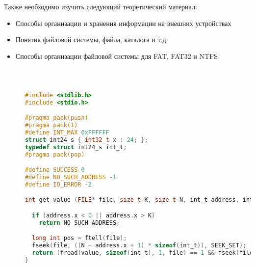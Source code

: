 \documentclass[a4paper,12pt]{article}
\begin{document}
\begin{flushleft}
    Также необходимо изучить следующий теоретический материал:
    \begin{itemize}
      \item Способы организации и хранения информации на внешних устройствах
      \item Понятия файловой системы, файла, каталога и т.д.
      \item Способы организации файловой системы для FAT, FAT32 и NTFS
    \end{itemize}
    
  \end{flushleft}
  
\newpage

  \begin{flushleft}
     \\[0.5em]
    \begin{lstlisting}[language=c, 
                      breaklines=true, 
                      showtabs=false, 
                      showspaces=false, 
                      showstringspaces=false,
                      basicstyle=\ttfamily \footnotesize]
    
      #include <stdlib.h>
      #include <stdio.h>

      #pragma pack(push)
      #pragma pack(1)
      #define INT_MAX 0xFFFFFF
      struct int24_s { int32_t x : 24; };
      typedef struct int24_s int_t;
      #pragma pack(pop)

      #define SUCCESS 0
      #define NO_SUCH_ADDRESS -1
      #define IO_ERROR -2

      int get_value (FILE* file, size_t K, size_t N, int_t address, int_t* value) {

        if (address.x < 0 || address.x > K)
          return NO_SUCH_ADDRESS;

        long int pos = ftell(file);
        fseek(file, ((N + address.x + 1) * sizeof(int_t)), SEEK_SET);
        return (fread(value, sizeof(int_t), 1, file) == 1 && fseek(file, pos, SEEK_SET) == 0) ? SUCCESS : IO_ERROR;
      }
      
    \end{lstlisting}
  \end{flushleft}
\end{document}
